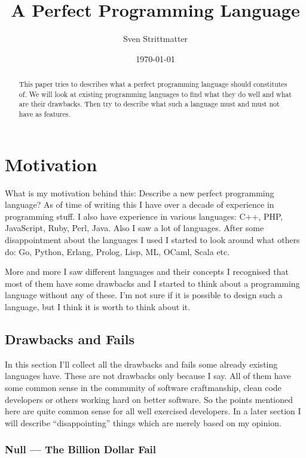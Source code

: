 \documentclass[11pt, a4paper]{report}
\title{A Perfect Programming Language}
\author{Sven Strittmatter}
\date{\today}
\begin{document}
\maketitle

\begin{abstract}
This paper tries to describes what a perfect programming language should constitutes of. We will look at existing programming languages to find what they do well and what are their drawbacks. Then try to describe what such a language must and must not have as features.
\end{abstract}

\tableofcontents

\chapter{Motivation}

What is my motivation behind this: Describe a new perfect programming language? As of time of writing this I have over a decade of experience in programming stuff. I also have experience in various languages: C++, PHP, JavaScript, Ruby, Perl, Java. Also I saw a lot of languages. After some disappointment about the languages I used I started to look around what others do: Go, Python, Erlang, Prolog, Lisp, ML, OCaml, Scala etc.

More and more I saw different languages and their concepts I recognised that most of them have some drawbacks and I started to think about a programming language without any of these. I'm not sure if it is possible to design such a language, but I think it is worth to think about it.

\section{Drawbacks and Fails}

In this section I'll collect all the drawbacks and fails some already existing languages have. These are not drawbacks only because I say. All of them have some common sense in the community of software craftmanship, clean code developers or others working hard on better software. So the points mentioned here are quite common sense for all well exercised developers. In a later section I will describe ``disappointing'' things which are merely based on my opinion.

\subsection{Null --- The Billion Dollar Fail}
\end{document}
